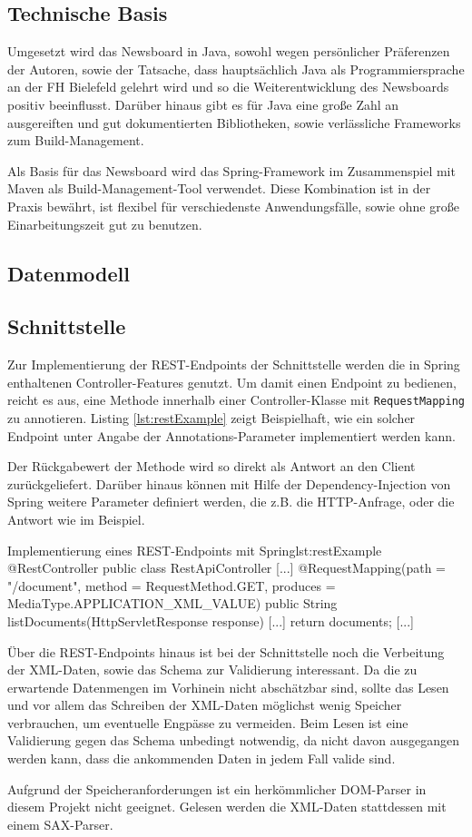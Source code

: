 \subsection{Technische Basis}
Umgesetzt wird das Newsboard in Java, sowohl wegen persönlicher Präferenzen der Autoren,
sowie der Tatsache, dass hauptsächlich Java als Programmiersprache
an der FH Bielefeld gelehrt wird und so die Weiterentwicklung des Newsboards
positiv beeinflusst. Darüber hinaus gibt es für Java eine große Zahl an ausgereiften
und gut dokumentierten Bibliotheken, sowie verlässliche Frameworks zum Build-Management.

Als Basis für das Newsboard wird das Spring-Framework im Zusammenspiel mit Maven
als Build-Management-Tool verwendet. Diese Kombination ist in der Praxis bewährt,
ist flexibel für verschiedenste Anwendungsfälle, sowie ohne große Einarbeitungszeit
gut zu benutzen.

\subsection{Datenmodell}

\subsection{Schnittstelle}
Zur Implementierung der REST-Endpoints der Schnittstelle werden die in Spring enthaltenen
Controller-Features genutzt. Um damit einen Endpoint zu bedienen, reicht es aus,
eine Methode innerhalb einer Controller-Klasse mit \texttt{RequestMapping} zu annotieren.
Listing \ref{lst:restExample} zeigt Beispielhaft, wie ein solcher Endpoint unter Angabe der
Annotations-Parameter implementiert werden kann.

Der Rückgabewert der Methode wird so direkt als Antwort an den Client zurückgeliefert.
Darüber hinaus können mit Hilfe der Dependency-Injection von Spring weitere Parameter definiert werden, die z.B. die HTTP-Anfrage, oder die Antwort wie im Beispiel.
\vspace{1em}

\begin{java}{Implementierung eines REST-Endpoints mit Spring}{lst:restExample}
@RestController
public class RestApiController {
	[...]
	@RequestMapping(path = "/document", method = RequestMethod.GET, produces = MediaType.APPLICATION_XML_VALUE)
	public String listDocuments(HttpServletResponse response) {
		[...]
		return documents;
	}
	[...]
}
\end{java}

Über die REST-Endpoints hinaus ist bei der Schnittstelle noch die Verbeitung der XML-Daten,
sowie das Schema zur Validierung interessant.
Da die zu erwartende Datenmengen im Vorhinein nicht abschätzbar sind,
sollte das Lesen und vor allem das Schreiben der XML-Daten möglichst wenig Speicher
verbrauchen, um eventuelle Engpässe zu vermeiden. Beim Lesen ist eine Validierung
gegen das Schema unbedingt notwendig, da nicht davon ausgegangen werden kann,
dass die ankommenden Daten in jedem Fall valide sind.

Aufgrund der Speicheranforderungen ist ein herkömmlicher DOM-Parser in diesem Projekt
nicht geeignet. Gelesen werden die XML-Daten stattdessen mit einem SAX-Parser.

